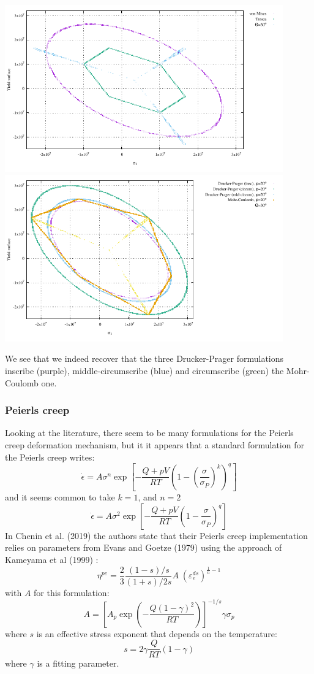 \begin{center}
\includegraphics[width=12cm]{images/rheology/surfaces/surfaces_plane2.pdf}
\includegraphics[width=12cm]{images/rheology/surfaces/surfaces_plane.pdf}
\end{center}

We see that we indeed recover that the three Drucker-Prager formulations 
inscribe (purple), middle-circumscribe (blue) and circumscribe (green) the 
Mohr-Coulomb one. 



\newpage
\subsubsection{Peierls creep}

Looking at the literature, there seem to be many formulations for the Peierls creep deformation
mechanism, but it it appears that a standard formulation for the Peierls creep writes:
\[
\dot{\epsilon} = A \sigma^n \exp \left[ -\frac{Q+pV}{RT} \left(1-(\frac{\sigma}{\sigma_P})^k\right)^q  \right]
\]
and it seems common to take $k=1$, and $n=2$ \cite{gery10,kaka08}
\[
\dot{\epsilon} = A \sigma^2 \exp \left[ -\frac{Q+pV}{RT} \left(1-\frac{\sigma}{\sigma_P}\right)^q  \right]
\]
In Chenin et al. (2019) \cite{chmd19} the authors state that their Peierls creep implementation
relies on parameters from Evans and Goetze (1979) \cite{evgo79} using the approach of 
Kameyama et al (1999) \cite{kayk99}:
\[
\eta^{pe}=\frac{2}{3} \frac{(1-s)/s}{(1+s)/2s} A \; (\varepsilon_e^{ds})^{\frac{1}{n}-1} 
\]
with $A$ for this formulation:
\[
A = \left[ A_p \exp \left( -\frac{Q(1-\gamma)^2}{RT} \right)  \right]^{-1/s} \gamma \sigma_p
\]
where $s$ is an effective stress exponent that depends on the temperature:
\[
s = 2 \gamma \frac{Q}{RT} (1-\gamma)
\]
where $\gamma$ is a fitting parameter. 


